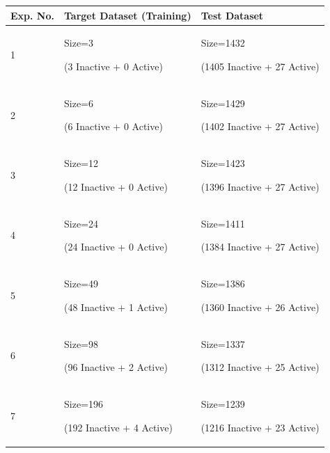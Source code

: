 \documentclass[a4paper,12pt, english]{article}
\begin{document}
\begin{itemize}
\begin{table}[h]
\centering
    \begin{tabular}{ | l | l | l | }
    \hline
      	\textbf{Exp. No.} & \textbf{Target Dataset (Training)} & \textbf{Test Dataset} \\ \hline
      	1 & Size=3   \begin{scriptsize}(3 Inactive + 0 Active)\end{scriptsize} & Size=1432 \begin{scriptsize}(1405 Inactive + 27 Active)\end{scriptsize}\\ \hline
	2 & Size=6   \begin{scriptsize}(6 Inactive + 0 Active)\end{scriptsize} & Size=1429 \begin{scriptsize}(1402 Inactive + 27 Active)\end{scriptsize}\\ \hline
	3 & Size=12  \begin{scriptsize}(12 Inactive + 0 Active)\end{scriptsize} & Size=1423 \begin{scriptsize}(1396 Inactive + 27 Active)\end{scriptsize}\\ \hline
	4 & Size=24  \begin{scriptsize}(24 Inactive + 0 Active)\end{scriptsize} & Size=1411 \begin{scriptsize}(1384 Inactive + 27 Active)\end{scriptsize}\\ \hline
	5 & Size=49  \begin{scriptsize}(48 Inactive + 1 Active)\end{scriptsize} & Size=1386 \begin{scriptsize}(1360 Inactive + 26 Active)\end{scriptsize}\\ \hline
	6 & Size=98  \begin{scriptsize}(96 Inactive + 2 Active)\end{scriptsize} & Size=1337 \begin{scriptsize}(1312 Inactive + 25 Active)\end{scriptsize}\\ \hline
	7 & Size=196 \begin{scriptsize}(192 Inactive + 4 Active)\end{scriptsize} & Size=1239 \begin{scriptsize}(1216 Inactive + 23 Active)\end{scriptsize}\\ \hline

\end{tabular}
\end{table}
\end{itemize}
\end{document}
